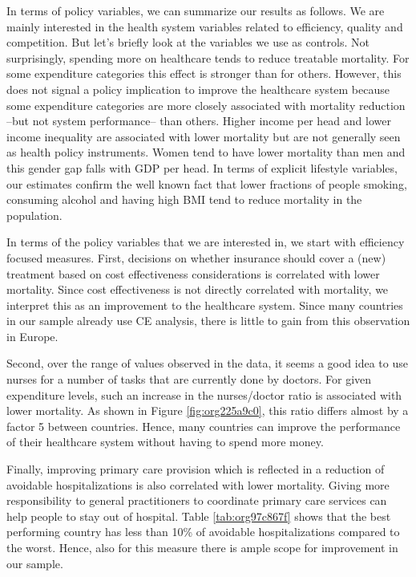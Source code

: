 \documentclass{article}
\begin{document}
In terms of policy variables, we can summarize our results as follows. We are mainly interested in the health system variables related to efficiency, quality and competition. But let's briefly look at the variables we use as controls. Not surprisingly, spending more on healthcare tends to reduce treatable mortality. For some expenditure categories this effect is stronger than for others. However, this does not signal a policy implication to improve the healthcare system because some expenditure categories are more closely associated with mortality reduction --but not system performance-- than others. Higher income per head and lower income inequality are associated with lower mortality but are not generally seen as health policy instruments. Women tend to have lower mortality than men and this gender gap falls with GDP per head. In terms of explicit lifestyle variables, our estimates confirm the well known fact that lower fractions of people smoking, consuming alcohol and having high BMI tend to reduce mortality in the population.

In terms of the policy variables that we are interested in, we start with efficiency focused measures. First, decisions on whether insurance should cover a (new) treatment based on cost effectiveness considerations is correlated with lower mortality. Since cost effectiveness is not directly correlated with mortality, we interpret this as an improvement to the healthcare system. Since many countries in our sample already use CE analysis, there is little to gain from this observation in Europe.

Second, over the range of values observed in the data, it seems a good idea to use nurses for a number of tasks that are currently done by doctors. For given expenditure levels, such an increase in the nurses/doctor ratio is associated with lower mortality. As shown in Figure \ref{fig:org225a9c0}, this ratio differs almost by a factor 5 between countries. Hence, many countries can improve the performance of their healthcare system without having to spend more money.

Finally, improving primary care provision which is reflected in a reduction of avoidable hospitalizations is also correlated with lower mortality. Giving more responsibility to general practitioners to coordinate primary care services can help people to stay out of hospital. Table \ref{tab:org97c867f} shows that the best performing country has less than 10\% of avoidable hospitalizations compared to the worst. Hence, also for this measure there is ample scope for improvement in our sample. 
\end{document}
